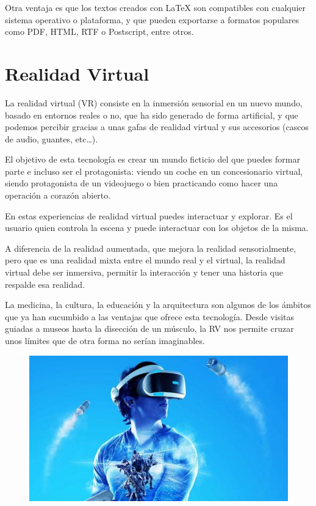 \documentclass[a4paper, 12pt]{book}
\begin{document}
Otra ventaja es que los textos creados con LaTeX son compatibles con cualquier sistema operativo o plataforma, y que pueden exportarse a formatos populares como PDF, HTML, RTF o Postscript, entre otros.


\newpage
\section{Realidad Virtual} 
\label{sec:VR}

La realidad virtual (VR) consiste en la inmersión sensorial en un nuevo mundo, basado en entornos reales o no, que ha sido generado de forma artificial, y que podemos percibir gracias a unas gafas de realidad virtual y sus accesorios (cascos de audio, guantes, etc…).

El objetivo de esta tecnología es crear un mundo ficticio del que puedes formar parte e incluso ser el protagonista: viendo un coche en un concesionario virtual, siendo protagonista de un videojuego o bien practicando como hacer una operación a corazón abierto.

 En estas experiencias de realidad virtual puedes interactuar y explorar. Es el usuario quien controla la escena y puede interactuar con los objetos de la misma.

A diferencia de la realidad aumentada, que mejora la realidad sensorialmente, pero que es una realidad mixta entre el mundo real y el virtual, la realidad virtual debe ser inmersiva, permitir la interacción y tener una historia que respalde esa realidad.

 La medicina, la cultura, la educación y la arquitectura son algunos de los ámbitos que ya han sucumbido a las ventajas que ofrece esta tecnología. Desde visitas guiadas a museos hasta la disección de un músculo, la RV nos permite cruzar unos límites que de otra forma no serían imaginables.
\\
\begin{figure}[h]
\centering
 \includegraphics[scale=1]{img/VR.jpg}
\end{figure}
\end{document}

